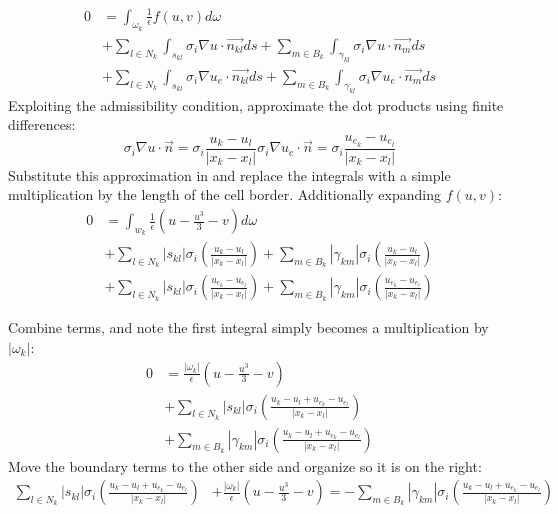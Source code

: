 \documentclass{finalproject}
\begin{document}
\begin{align*}
    0 &=\int_{\omega_k}\frac{1}{\epsilon}f(u,v)d\omega \\ 
    &+ \sum_{l \in N_k}\int_{s_{kl}} \sigma_i \nabla u \cdot \overrightarrow{n_{kl}}ds +
    \sum_{m \in B_k}\int_{\gamma_{kl}} \sigma_i \nabla u \cdot \overrightarrow{n_{m}}ds \\
    &+ \sum_{l \in N_k}\int_{s_{kl}} \sigma_i \nabla u_e \cdot \overrightarrow{n_{kl}}ds +
    \sum_{m \in B_k}\int_{\gamma_{kl}} \sigma_i \nabla u_e \cdot \overrightarrow{n_{m}}ds
\end{align*}
Exploiting the admissibility condition, approximate the dot products using finite differences:
\begin{equation}
    \sigma_i \nabla u \cdot \overrightarrow{n} = \sigma_i \frac{u_k - u_l}{|x_k - x_l|}
    \sigma_i \nabla u_e \cdot \overrightarrow{n} = \sigma_i \frac{u_{e_k} - u_{e_l}}{|x_k - x_l|}
\end{equation}
Substitute this approximation in and replace the integrals with a simple multiplication by the length of the cell border. Additionally expanding $f(u,v)$:
\begin{align*}
0 &= \int_{w_k}\frac{1}{\epsilon}(u - \frac{u^3}{3} - v)d\omega\\
&+ \sum_{l \in N_k} |s_{kl}| \sigma_i ( \frac{u_k - u_l}{|x_k - x_l|} ) + 
\sum_{m \in B_k} |\gamma_{km}| \sigma_i ( \frac{u_k - u_l}{|x_k - x_l|} )  \\
&+ \sum_{l \in N_k} |s_{kl}| \sigma_i ( \frac{u_{e_k} - u_{e_l}}{|x_k - x_l|} ) + 
\sum_{m \in B_k} |\gamma_{km}| \sigma_i ( \frac{u_{e_k} - u_{e_l}}{|x_k - x_l|} ) 
\end{align*}

Combine terms, and note the first integral simply becomes a multiplication by $|\omega_k|$:
\begin{align*}
0 &= \frac{|\omega_k|}{\epsilon}(u - \frac{u^3}{3} - v)\\
&+ \sum_{l \in N_k} |s_{kl}| \sigma_i ( \frac{u_k - u_l + u_{e_k} - u_{e_l}}{|x_k - x_l|} ) \\
&+ \sum_{m \in B_k} |\gamma_{km}| \sigma_i ( \frac{u_k - u_l + u_{e_k} - u_{e_l}}{|x_k - x_l|} ) 
\end{align*}
Move the boundary terms to the other side and organize so it is on the right:
\begin{align*}
\sum_{l \in N_k} |s_{kl}| \sigma_i ( \frac{u_k - u_l + u_{e_k} - u_{e_l}}{|x_k - x_l|} )
&+ \frac{|\omega_k|}{\epsilon}(u - \frac{u^3}{3} - v)
= -\sum_{m \in B_k} |\gamma_{km}| \sigma_i ( \frac{u_k - u_l + u_{e_k} - u_{e_l}}{|x_k - x_l|} ) 
\end{align*}
\end{document}
